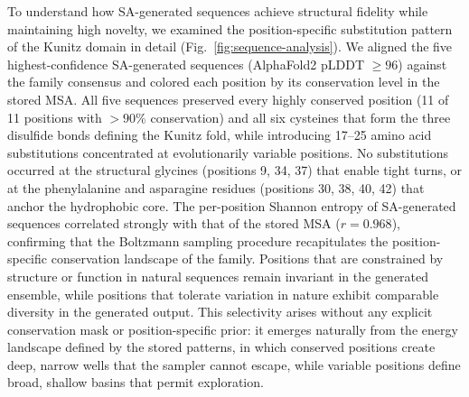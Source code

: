 To understand how SA-generated sequences achieve structural fidelity while maintaining high novelty, we examined the position-specific substitution pattern of the Kunitz domain in detail (Fig.~\ref{fig:sequence-analysis}). We aligned the five highest-confidence SA-generated sequences (AlphaFold2 pLDDT $\geq 96$) against the family consensus and colored each position by its conservation level in the stored MSA. All five sequences preserved every highly conserved position (11 of 11 positions with $>90\%$ conservation) and all six cysteines that form the three disulfide bonds defining the Kunitz fold, while introducing 17--25 amino acid substitutions concentrated at evolutionarily variable positions. No substitutions occurred at the structural glycines (positions 9, 34, 37) that enable tight turns, or at the phenylalanine and asparagine residues (positions 30, 38, 40, 42) that anchor the hydrophobic core. The per-position Shannon entropy of SA-generated sequences correlated strongly with that of the stored MSA ($r{=}0.968$), confirming that the Boltzmann sampling procedure recapitulates the position-specific conservation landscape of the family. Positions that are constrained by structure or function in natural sequences remain invariant in the generated ensemble, while positions that tolerate variation in nature exhibit comparable diversity in the generated output. This selectivity arises without any explicit conservation mask or position-specific prior: it emerges naturally from the energy landscape defined by the stored patterns, in which conserved positions create deep, narrow wells that the sampler cannot escape, while variable positions define broad, shallow basins that permit exploration.


